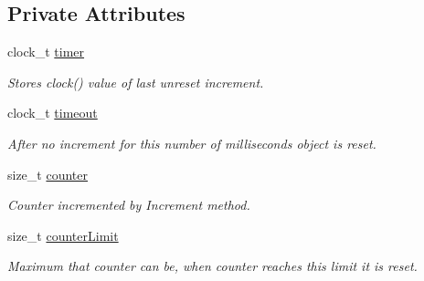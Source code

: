 \subsection*{Private Attributes}
\begin{DoxyCompactItemize}
\item 
\hypertarget{class_counter_a4cd5ab600cf2240e70150303a1dcc043}{
clock\_\-t \hyperlink{class_counter_a4cd5ab600cf2240e70150303a1dcc043}{timer}}
\label{class_counter_a4cd5ab600cf2240e70150303a1dcc043}

\begin{DoxyCompactList}\small\item\em Stores clock() value of last unreset increment. \item\end{DoxyCompactList}\item 
\hypertarget{class_counter_aaf8311a4c0e6608e29b4b73815ca4e59}{
clock\_\-t \hyperlink{class_counter_aaf8311a4c0e6608e29b4b73815ca4e59}{timeout}}
\label{class_counter_aaf8311a4c0e6608e29b4b73815ca4e59}

\begin{DoxyCompactList}\small\item\em After no increment for this number of milliseconds object is reset. \item\end{DoxyCompactList}\item 
\hypertarget{class_counter_a38772b10f98e364586216fe90ebdb194}{
size\_\-t \hyperlink{class_counter_a38772b10f98e364586216fe90ebdb194}{counter}}
\label{class_counter_a38772b10f98e364586216fe90ebdb194}

\begin{DoxyCompactList}\small\item\em Counter incremented by Increment method. \item\end{DoxyCompactList}\item 
\hypertarget{class_counter_a3fcc72a60f11ec2d1cdbfee9c9972a69}{
size\_\-t \hyperlink{class_counter_a3fcc72a60f11ec2d1cdbfee9c9972a69}{counterLimit}}
\label{class_counter_a3fcc72a60f11ec2d1cdbfee9c9972a69}

\begin{DoxyCompactList}\small\item\em Maximum that counter can be, when counter reaches this limit it is reset. \item\end{DoxyCompactList}\end{DoxyCompactItemize}


